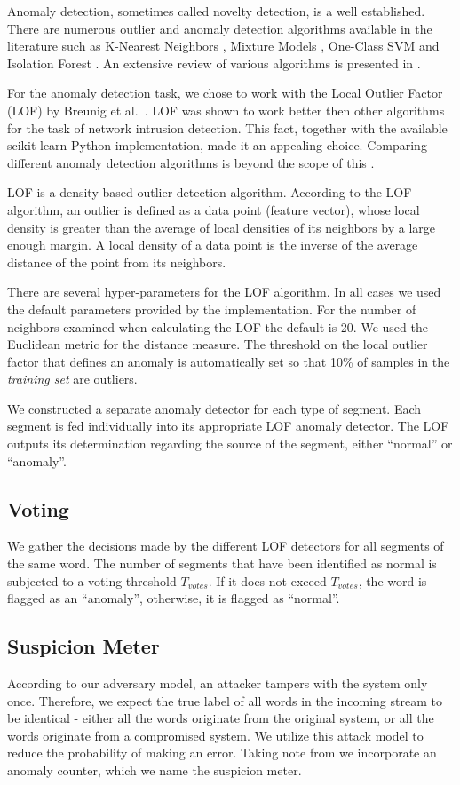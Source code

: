 \documentclass[compsoc,conference,a4paper]{IEEEtran}
\newcommand{\sublevel}[1]{\subsection{#1}}
\newcommand{\sublevel}[1]{\section{#1}}
\begin{document}
  Anomaly detection, sometimes called novelty detection, is a well established. There are numerous outlier and anomaly detection algorithms available in the literature such as K-Nearest Neighbors \cite{hautamaki2004outlier}, Mixture Models \cite{paalanen2006feature}, One-Class SVM \cite{scholkopf2000support} and Isolation Forest \cite{liu2008isolation}. An extensive review of various algorithms is presented in \cite{pimentel2014review}.
  
  For the anomaly detection task, we chose to work with the Local Outlier Factor (LOF) by Breunig et al.\ \cite{breunig2000lof}. LOF was shown to work better then other algorithms for the task of network intrusion detection\cite{lazarevic2003comparative}. This fact, together with the available scikit-learn \cite{scikit-learn} Python implementation, made it an appealing choice. Comparing different anomaly detection algorithms is beyond the scope of this \iftoggle{paper} {paper} {work}.
  
  LOF is a density based outlier detection algorithm. According to the LOF algorithm, an outlier is defined as a data point (feature vector), whose local density is greater than the average of local densities of its neighbors by a large enough margin. A local density of a data point is the inverse of the average distance of the point from its neighbors.
  
  There are several hyper-parameters for the LOF algorithm. In all cases we used the default parameters provided by the implementation. For the number of neighbors examined when calculating the LOF the default is 20. We used the Euclidean metric for the distance measure. The threshold on the local outlier factor that defines an anomaly is automatically set so that 10\% of samples in the \textit{training set} are outliers.
  
  We constructed a separate anomaly detector for each type of segment. Each segment is fed individually into its appropriate LOF anomaly detector. The LOF outputs its determination regarding the source of the segment, either ``normal'' or ``anomaly''.
  
\sublevel{Voting}
  We gather the decisions made by the different LOF detectors for all segments of the same word. The number of segments that have been identified as normal is subjected to a voting threshold $T_{votes}$. If it does not exceed $T_{votes}$, the word is flagged as an ``anomaly'', otherwise, it is flagged as ``normal''.
  
\sublevel{Suspicion Meter}
  According to our adversary model, an attacker tampers with the system only once. Therefore, we expect the true label of all words in the incoming stream to be identical - either all the words originate from the original system, or all the words originate from a compromised system. We utilize this attack model to reduce the probability of making an error. Taking note from \cite{kneib2018scission} we incorporate an anomaly counter, which we name the suspicion meter.
  
\end{document}

